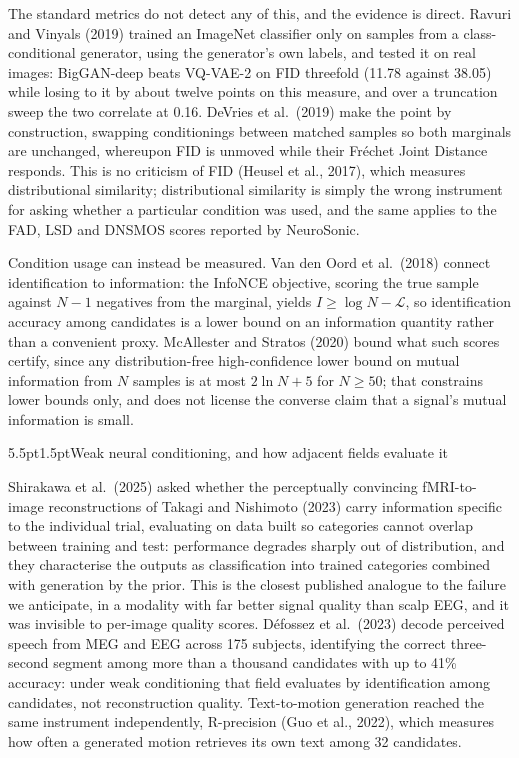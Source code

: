 \documentclass[11pt]{article}
\makeatletter
\renewcommand\section{\@startsection{section}{1}{\z@}%
  {5.5pt\@plus2pt\@minus2pt}{1.5pt}{\normalfont\large\bfseries}}
\makeatother
\begin{document}
The standard metrics do not detect any of this, and the evidence is direct. Ravuri and Vinyals (2019) trained an ImageNet classifier only on samples from a class-conditional generator, using the generator's own labels, and tested it on real images: BigGAN-deep beats VQ-VAE-2 on FID threefold (11.78 against 38.05) while losing to it by about twelve points on this measure, and over a truncation sweep the two correlate at 0.16. DeVries et al.~(2019) make the point by construction, swapping conditionings between matched samples so both marginals are unchanged, whereupon FID is unmoved while their Fr\'echet Joint Distance responds. This is no criticism of FID (Heusel et al., 2017), which measures distributional similarity; distributional similarity is simply the wrong instrument for asking whether a particular condition was used, and the same applies to the FAD, LSD and DNSMOS scores reported by NeuroSonic.

Condition usage can instead be measured. Van den Oord et al.~(2018) connect identification to information: the InfoNCE objective, scoring the true sample against $N-1$ negatives from the marginal, yields $I \geq \log N - \mathcal{L}$, so identification accuracy among candidates is a lower bound on an information quantity rather than a convenient proxy. McAllester and Stratos (2020) bound what such scores certify, since any distribution-free high-confidence lower bound on mutual information from $N$ samples is at most $2\ln N + 5$ for $N \geq 50$; that constrains lower bounds only, and does not license the converse claim that a signal's mutual information is small.

\section{Weak neural conditioning, and how adjacent fields evaluate it}

Shirakawa et al.~(2025) asked whether the perceptually convincing fMRI-to-image reconstructions of Takagi and Nishimoto (2023) carry information specific to the individual trial, evaluating on data built so categories cannot overlap between training and test: performance degrades sharply out of distribution, and they characterise the outputs as classification into trained categories combined with generation by the prior. This is the closest published analogue to the failure we anticipate, in a modality with far better signal quality than scalp EEG, and it was invisible to per-image quality scores. D\'efossez et al.~(2023) decode perceived speech from MEG and EEG across 175 subjects, identifying the correct three-second segment among more than a thousand candidates with up to 41\% accuracy: under weak conditioning that field evaluates by identification among candidates, not reconstruction quality. Text-to-motion generation reached the same instrument independently, R-precision (Guo et al., 2022), which measures how often a generated motion retrieves its own text among 32 candidates.
\end{document}
